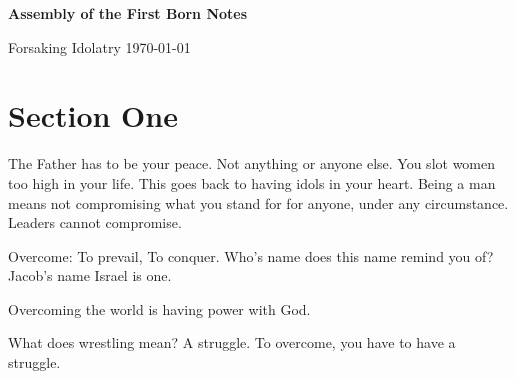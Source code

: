 \documentclass[12pt]{article}
\begin{document}
	\textbf{Assembly of the First Born \hfill Notes}

	Forsaking Idolatry \hfill \today
	
	\begin{quote}
		\BibleFirstJohnFiveTwentyOne{}
	\end{quote}

	\section*{\normalsize Section One}

	\begin{quote}
		\BibleFirstJohnFiveOne{}
		\BibleFirstJohnFiveTwo{}
		\BibleFirstJohnFiveThree{}
		\BibleFirstJohnFiveFour{}
	\end{quote}

	\begin{quote}
		\BibleJohnSixteenThirtyTwo{}
	\end{quote}

	The Father has to be your peace. Not anything or anyone else.
	You slot women too high in your life. This goes back to having
	idols in your heart. Being a man means not compromising what
	you stand for for anyone, under any circumstance. Leaders cannot
	compromise.

	\begin{quote}
		\BibleJohnSixteenThirtyThree{}
	\end{quote}

	Overcome: To prevail, To conquer. Who's name does this name
	remind you of? Jacob's name Israel is one. 

	\begin{quote}
		\BibleGenesisThirtyTwoTwentyEight{}
	\end{quote}

	Overcoming the world is having power with God.

	\begin{quote}
		\BibleGenesisThirtyEight{}
	\end{quote}

	What does wrestling mean? A struggle. To overcome, you have
	to have a struggle.

	\begin{quote}
		\BibleActsFourteenTwentyTwo{}
	\end{quote}

	\begin{quote}
		\BibleMatthewTwentySixFortyOne{}
	\end{quote}
\end{document}

